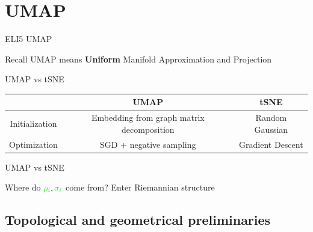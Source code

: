 \documentclass[unknownkeysallowed]{beamer}
\begin{document}
\section{UMAP}


\begin{frame}{ELI5 UMAP}

\begin{flushleft}
Recall UMAP means \textbf{Uniform} Manifold Approximation and Projection
\end{flushleft}

\end{frame}

\begin{frame}{UMAP vs tSNE}
\begin{tabular}{c|c|c}
& UMAP & tSNE\\
\hline
Initialization & Embedding from graph matrix decomposition & Random Gaussian \\
\hline
Optimization & SGD + negative sampling & Gradient Descent \\
\end{tabular}
\end{frame}

\begin{frame}{UMAP vs tSNE}

{
}
\begin{block}{Where do $\textcolor{green}{\rho_i}, \textcolor{green}{\sigma_i}$ come from?}
Enter Riemannian structure
\end{block}
\end{frame}



\subsection{Topological and geometrical preliminaries}
\end{document}
